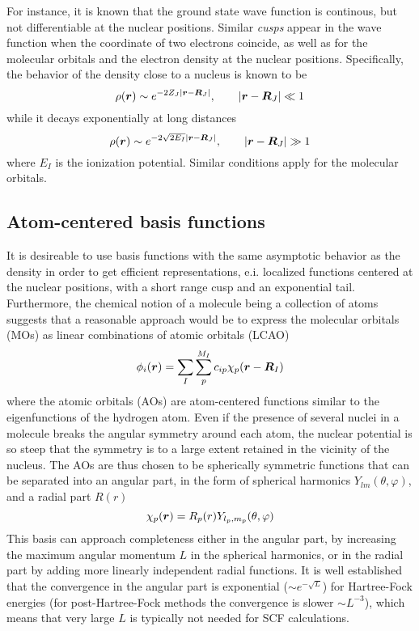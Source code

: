 For instance, it is known that the ground state wave function is continous, but not differentiable 
at the nuclear positions\cite{Kato:1957}.
Similar \emph{cusps} appear in the wave function when the coordinate of two electrons coincide, 
as well as for the molecular orbitals and the electron density at the nuclear positions. 
Specifically, the behavior of the density close to a nucleus is known to be
\begin{equation}
    \rho(\boldsymbol r) \sim e^{-2Z_J|\boldsymbol r-\boldsymbol R_J|}, \qquad |\boldsymbol r-\boldsymbol R_J| \ll 1
\end{equation}
while it decays exponentially at long distances 
\begin{equation}
    \rho(\boldsymbol r) \sim e^{-2\sqrt{2E_I}|\boldsymbol r-\boldsymbol R_J|}, \qquad |\boldsymbol r - \boldsymbol R_J| \gg 1
\end{equation}
where $E_I$ is the ionization potential. Similar conditions apply for the molecular orbitals.

\subsection{Atom-centered basis functions}
It is desireable to use basis functions with the same asymptotic behavior as the density in order 
to get efficient representations, e.i. localized functions centered at the nuclear positions, with 
a short range cusp and an exponential tail. Furthermore, the chemical notion of a molecule being 
a collection of atoms suggests that a reasonable approach would be to express the molecular orbitals 
(MOs) as linear combinations of atomic orbitals (LCAO)
\begin{equation}
    \phi_i(\boldsymbol r) = \sum_I\sum_p^{M_I} c_{ip}\chi_p(\boldsymbol r-\boldsymbol R_I) 
\end{equation}
where the atomic orbitals (AOs) are atom-centered functions similar to the eigenfunctions of the 
hydrogen atom. Even if the presence of several nuclei in a molecule breaks the angular symmetry
around each atom, the nuclear potential is so steep that the symmetry is to a large extent retained
in the vicinity of the nucleus. The AOs are thus chosen to be spherically symmetric functions that 
can be separated into an angular part, in the form of spherical harmonics $Y_{lm}(\theta,\varphi)$, 
and a radial part $R(r)$
\begin{equation}
    \chi_p (\boldsymbol r) = R_p(r)Y_{l_p,m_p}(\theta,\varphi)
\end{equation}
This basis can approach completeness either in the angular part, by increasing the maximum angular 
momentum $L$ in the spherical harmonics, or in the radial part by adding more linearly independent
radial functions. It is well established that the convergence in the angular part is exponential
($\sim e^{-\sqrt{L}}$) for Hartree-Fock energies (for post-Hartree-Fock methods the convergence is 
slower $\sim L^{-3}$), which means that very large $L$ is typically not needed for SCF calculations. 

